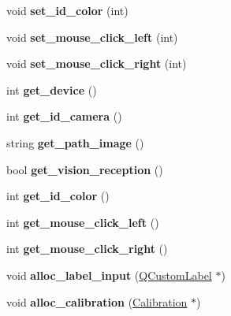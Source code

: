 \begin{DoxyCompactItemize}
\item 
void {\bfseries set\+\_\+id\+\_\+color} (int)\hypertarget{classcalibration_a6e2c50598a4f5d49c6d7bda23b69ddf3}{}\label{classcalibration_a6e2c50598a4f5d49c6d7bda23b69ddf3}

\item 
void {\bfseries set\+\_\+mouse\+\_\+click\+\_\+left} (int)\hypertarget{classcalibration_aaaf40baef708cb370c468ea0799ffaf6}{}\label{classcalibration_aaaf40baef708cb370c468ea0799ffaf6}

\item 
void {\bfseries set\+\_\+mouse\+\_\+click\+\_\+right} (int)\hypertarget{classcalibration_a788f9207f8641b1c3d3a74760e636bb3}{}\label{classcalibration_a788f9207f8641b1c3d3a74760e636bb3}

\item 
int {\bfseries get\+\_\+device} ()\hypertarget{classcalibration_a4c62df2cfea03276dde05134fd234b2c}{}\label{classcalibration_a4c62df2cfea03276dde05134fd234b2c}

\item 
int {\bfseries get\+\_\+id\+\_\+camera} ()\hypertarget{classcalibration_a94b344ed8858fcb8509ba313d101d9c2}{}\label{classcalibration_a94b344ed8858fcb8509ba313d101d9c2}

\item 
string {\bfseries get\+\_\+path\+\_\+image} ()\hypertarget{classcalibration_aa607fee8c37d34cf3d812063ca7fb626}{}\label{classcalibration_aa607fee8c37d34cf3d812063ca7fb626}

\item 
bool {\bfseries get\+\_\+vision\+\_\+reception} ()\hypertarget{classcalibration_a567ceb5a68243624b3240955fdbfc50e}{}\label{classcalibration_a567ceb5a68243624b3240955fdbfc50e}

\item 
int {\bfseries get\+\_\+id\+\_\+color} ()\hypertarget{classcalibration_a284e8a7b65d67601bd8d7bef949524df}{}\label{classcalibration_a284e8a7b65d67601bd8d7bef949524df}

\item 
int {\bfseries get\+\_\+mouse\+\_\+click\+\_\+left} ()\hypertarget{classcalibration_a45d0e76b3f360c7b198166cf7ccc638d}{}\label{classcalibration_a45d0e76b3f360c7b198166cf7ccc638d}

\item 
int {\bfseries get\+\_\+mouse\+\_\+click\+\_\+right} ()\hypertarget{classcalibration_a8053c43e483faf127e20e16ff4ee6d8a}{}\label{classcalibration_a8053c43e483faf127e20e16ff4ee6d8a}

\item 
void {\bfseries alloc\+\_\+label\+\_\+input} (\hyperlink{classQCustomLabel}{Q\+Custom\+Label} $\ast$)\hypertarget{classcalibration_ab0b5f5514c665852aa63830121622518}{}\label{classcalibration_ab0b5f5514c665852aa63830121622518}

\item 
void {\bfseries alloc\+\_\+calibration} (\hyperlink{structcommon_1_1Calibration}{Calibration} $\ast$)\hypertarget{classcalibration_ac5e4cd1cead7176b0f34586112aaa918}{}\label{classcalibration_ac5e4cd1cead7176b0f34586112aaa918}

\end{DoxyCompactItemize}
